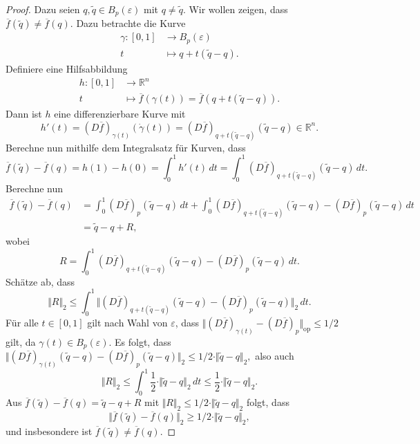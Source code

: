 \documentclass[../main.tex]{subfiles}
\begin{document}
\begin{proof}
  Dazu seien $q, \widetilde q \in B_{p}(\varepsilon)$
  mit $q \neq \widetilde q$.
  Wir wollen zeigen, dass $ \overline f(\widetilde q) \neq  \overline f(q)$.
  Dazu betrachte die Kurve
  \begin{align*}
    \gamma \colon [0, 1] & \to B_p(\varepsilon) \\
    t & \mapsto q + t(\widetilde q - q).
  \end{align*}
  Definiere eine Hilfsabbildung
  \begin{align*}
    h \colon [0, 1] & \to \mathbb{R}^n \\
    t & \mapsto \overline f (\gamma(t)) = \overline f(q + t(\widetilde q - q)).
  \end{align*}
  Dann ist $h$ eine differenzierbare Kurve mit
  \[
    h'(t) = {(D\overline f)}_{\gamma(t)}(\dot \gamma(t))
    = {(D \overline f)}_{q + t(\widetilde q - q)}( \widetilde q - q) \in \mathbb{R}^n.
  \]
  Berechne nun mithilfe dem Integralsatz
  für Kurven, dass
  \[
      \overline f(\widetilde q) -  \overline f(q)
     = h(1) - h(0)
     =\int_{0}^{1} h'(t) \, dt
    = \int_{0}^{1} {(D \overline f)}_{q + t(\widetilde q - q)}(\widetilde q - q) \, dt.
  \]
  Berechne nun
  \begin{align*}
    \overline f(\widetilde q) - \overline f(q)
    & = \int_{0}^{1} {(D \overline f)}_p (\widetilde q - q) \, dt
    + \int_{0}^{1} {(D \overline f)}_{q + t(\widetilde q - q)}
    (\widetilde q - q) - {(D \overline f)}_p (\widetilde q - q)\, dt\\
    &= \widetilde q - q + R,
  \end{align*}
  wobei
  \[
    R = \int_{0}^{1} {(D \overline f)}_{q + t(\widetilde q - q)}
     (\widetilde q - q) - {(D \overline f)}_p (\widetilde q - q)\, dt.
  \]
  Schätze ab, dass
  \[
    \Vert R \Vert_2
    \leq \int_{0}^{1} \Vert {(D \overline f)}_{q + t(\widetilde q - q)}
    (\widetilde q - q) - {(D \overline f)}_p (\widetilde q - q)\Vert_2 \, dt.
  \]
  Für alle $t \in [0, 1]$ gilt nach Wahl von $\varepsilon$,
  dass
  \(
    \Vert {(D \overline f)}_{\gamma (t)} - {(D \overline f)}_p \Vert_{\text{op}} \leq 1/2
  \)
  gilt, da $\gamma(t) \in B_p(\varepsilon)$.
  Es folgt, dass
  \(
    \Vert {(D \overline f)}_{\gamma(t)}
    (\widetilde q - q) - {(D \overline f)}_p (\widetilde q - q)\Vert_2
    \leq 1/2 \cdot \Vert \widetilde q - q \Vert_2,
  \)
  also auch
  \[
    \Vert R \Vert_2 \leq \int_{0}^{1} \frac{1}{2} \cdot
    \Vert \widetilde q - q \Vert_2 \, dt
    \leq \frac{1}{2} \cdot \Vert \widetilde q - q \Vert_2.
  \]
  Aus $\overline f (\widetilde q ) - \overline f(q) = \widetilde q - q + R$
  mit $\Vert R \Vert_2 \leq 1/2 \cdot \Vert \widetilde q - q \Vert_2$
  folgt, dass
   \[
     \Vert \overline f (\widetilde q ) - \overline f(q) \Vert_2 \geq
     1/2 \cdot \Vert \widetilde q - q \Vert_2,
  \]
  und insbesondere ist $\overline f (\widetilde q ) \neq \overline f ( q)$.
\end{proof}
\end{document}
